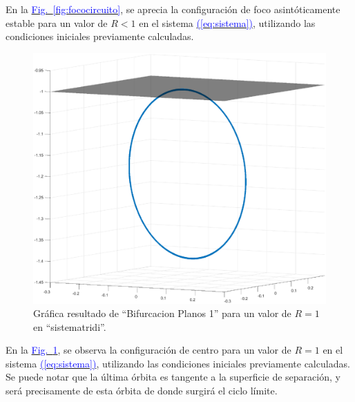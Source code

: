 \documentclass[12pt,a4paper]{report} %
\newcommand{\fref}[1]{\hyperref[#1]{\textcolor{blue}{Fig.~\ref*{#1}}}}
\newcommand{\eref}[1]{\hyperref[#1]{\textcolor{blue}{(\ref*{#1})}}}
\begin{document}
	\vspace{0.5cm}\noindent En la \fref{fig:fococircuito}, se aprecia la configuración de foco asintóticamente estable para un valor de $R<1$ en el sistema \eref{eq:sistema}, utilizando las condiciones iniciales previamente calculadas.
	
	\newpage
	
	\begin{figure}[h]
		\centering
		\includegraphics[width=1\textwidth]{centrocir.eps}
		\caption{Gráfica resultado de ``Bifurcacion Planos 1'' para un valor de $R=1$ en ``sistematridi''.}
		\label{fig:centrocircuito}
	\end{figure}\smallskip
	
		\vspace{0.5cm}\noindent En la \fref{fig:centrocircuito}, se observa la configuración de centro para un valor de $R=1$ en el sistema \eref{eq:sistema}, utilizando las condiciones iniciales previamente calculadas. Se puede notar que la última órbita es tangente a la superficie de separación, y será precisamente de esta órbita de donde surgirá el ciclo límite.
	
	\newpage
	
\end{document}
